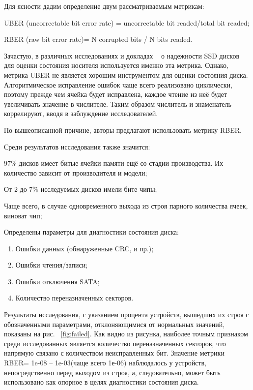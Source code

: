 Для ясности дадим определение двум рассматриваемым метрикам:
\begin{itemize*}
	\item{UBER (uncorrectable bit error rate) = uncorrectable bit readed/total bit readed;}
	\item{RBER (raw bit error rate)= N corrupted bits / N bits readed.}
\end{itemize*}
Зачастую, в различных исследованиях и докладах ~\cite{art} о надежности SSD дисков для оценки состояния носителя используется именно эта метрика. 
Однако, метрика UBER не является хорошим инструментом для оценки состояния диска. Алгоритмическое исправление ошибок чаще всего реализовано циклически, поэтому прежде чем ячейка будет исправлена, каждое чтение из неё будет увеличивать значение в числителе. Таким образом числитель и знаменатель коррелируют, вводя в заблуждение исследователей. 

По вышеописанной причине, авторы предлагают использовать метрику RBER. 


Среди результатов исследования также значится:
\begin{itemize*}
	\item{97\% дисков имеет битые ячейки памяти ещё со стадии производства. Их количество зависит от производителя и модели;} 
    \item{От 2 до 7\% исследуемых дисков имели бите чипы;}
    \item{Чаще всего, в случае одновременного выхода из строя парного количества ячеек, виноват чип;} 
    \item{Определены параметры для диагностики состояния диска:}
	\begin{enumerate}
		\item{Ошибки данных (обнаруженные CRC, и пр.);}
		\item{Ошибки чтения/записи;}
		\item{Ошибки отключения SATA;}
		\item{Количество переназначенных секторов.}
	\end{enumerate}
\end{itemize*}

Результаты исследования, с указанием процента устройств, вышедших их строя с обозначенными параметрами, отклоняющимися от нормальных значений, показаны на рис. ~\ref{fig:failed}. Как видно из рисунка, наиболее точным признаком среди исследованных является количество переназначенных секторов, что напрямую связано с количеством неисправленных бит.
Значение метрики RBER= 1e-08 – 1e-03(чаще всего 1е-06) наблюдалось у устройств, непосредственно перед выходом из строя, а, следовательно, может быть использовано как опорное в целях диагностики состояния диска.

